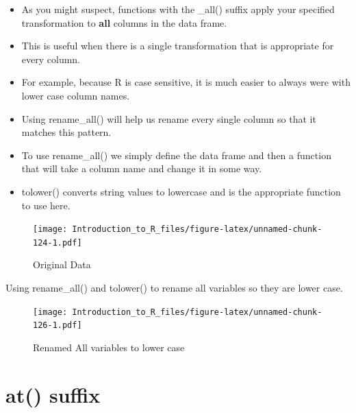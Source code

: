 \documentclass[]{book}
\newenvironment{Shaded}{\begin{snugshade}}{\end{snugshade}}
\newcommand{\KeywordTok}[1]{\textcolor[rgb]{0.13,0.29,0.53}{\textbf{#1}}}
\newcommand{\NormalTok}[1]{#1}
\newcommand{\OperatorTok}[1]{\textcolor[rgb]{0.81,0.36,0.00}{\textbf{#1}}}
\newcommand{\StringTok}[1]{\textcolor[rgb]{0.31,0.60,0.02}{#1}}
\providecommand{\tightlist}{%
  \setlength{\itemsep}{0pt}\setlength{\parskip}{0pt}}
\theoremstyle{definition}
\theoremstyle{definition}
\theoremstyle{definition}
\theoremstyle{remark}
\let\BeginKnitrBlock\begin \let\EndKnitrBlock\end
\begin{document}
\begin{itemize}
\tightlist
\item
  As you might suspect, functions with the \_all() suffix apply your specified transformation to \textbf{all} columns in the data frame.
\item
  This is useful when there is a single transformation that is appropriate for every column.
\item
  For example, because R is case sensitive, it is much easier to always were with lower case column names.
\item
  Using rename\_all() will help us rename every single column so that it matches this pattern.
\item
  To use rename\_all() we simply define the data frame and then a function that will take a column name and change it in some way.
\item
  tolower() converts string values to lowercase and is the appropriate function to use here.
\end{itemize}

\begin{figure}
\centering
\texttt{[image: Introduction\_to\_R\_files/figure-latex/unnamed-chunk-124-1.pdf]}
\caption{\label{fig:unnamed-chunk-124}Original Data}
\end{figure}

\BeginKnitrBlock{example}
\protect\hypertarget{exm:renameall}{}{\label{exm:renameall} }Using rename\_all() and tolower() to rename all variables so they are lower case.
\EndKnitrBlock{example}

\begin{Shaded}
\end{Shaded}

\begin{figure}
\centering
\texttt{[image: Introduction\_to\_R\_files/figure-latex/unnamed-chunk-126-1.pdf]}
\caption{\label{fig:unnamed-chunk-126}Renamed All variables to lower case}
\end{figure}

\hypertarget{at-suffix}{%
\section{at() suffix}\label{at-suffix}}
\end{document}
